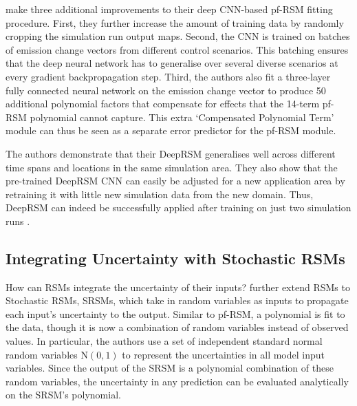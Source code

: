 \newpar \citeauthor{deep-rsm-2020} make three additional improvements to their deep CNN-based pf-RSM fitting procedure. First, they further increase the amount of training data by randomly cropping the simulation run output maps. Second, the CNN is trained on batches of emission change vectors from different control scenarios. This batching ensures that the deep neural network has to generalise over several diverse scenarios at every gradient backpropagation step. Third, the authors also fit a three-layer fully connected neural network on the emission change vector to produce 50 additional polynomial factors that compensate for effects that the 14-term pf-RSM polynomial cannot capture. This extra `Compensated Polynomial Term' module can thus be seen as a separate error predictor for the pf-RSM module.

The authors demonstrate that their DeepRSM generalises well across different time spans and locations in the same simulation area. They also show that the pre-trained DeepRSM CNN can easily be adjusted for a new application area by retraining it with little new simulation data from the new domain. Thus, DeepRSM can indeed be successfully applied after training on just two simulation runs \cite{deep-rsm-2020}.

\subsection{Integrating Uncertainty with Stochastic RSMs} \label{txt:stochastic-rsm}

How can RSMs integrate the uncertainty of their inputs? \textcite{srsm-phd-1999} further extend RSMs to Stochastic RSMs, SRSMs, which take in random variables as inputs to propagate each input's uncertainty to the output. Similar to pf-RSM, a polynomial is fit to the data, though it is now a combination of random variables instead of observed values. In particular, the authors use a set of independent standard normal random variables $\text{N}(0, 1)$ to represent the uncertainties in all model input variables. Since the output of the SRSM is a polynomial combination of these random variables, the uncertainty in any prediction can be evaluated analytically on the SRSM's polynomial.

